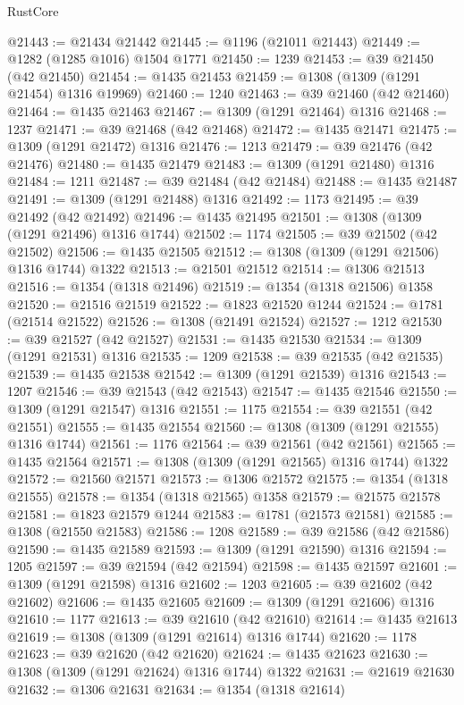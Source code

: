 \begin{lexlean}{RustCore}
\begin{coremodule}
@21443 := @21434 @21442
@21445 := @1196 (@21011 @21443)
@21449 := @1282 (@1285 @1016) @1504 @1771
@21450 := 1239
@21453 := @39 @21450 (@42 @21450)
@21454 := @1435 @21453
@21459 := @1308 (@1309 (@1291 @21454) @1316 @19969)
@21460 := 1240
@21463 := @39 @21460 (@42 @21460)
@21464 := @1435 @21463
@21467 := @1309 (@1291 @21464) @1316
@21468 := 1237
@21471 := @39 @21468 (@42 @21468)
@21472 := @1435 @21471
@21475 := @1309 (@1291 @21472) @1316
@21476 := 1213
@21479 := @39 @21476 (@42 @21476)
@21480 := @1435 @21479
@21483 := @1309 (@1291 @21480) @1316
@21484 := 1211
@21487 := @39 @21484 (@42 @21484)
@21488 := @1435 @21487
@21491 := @1309 (@1291 @21488) @1316
@21492 := 1173
@21495 := @39 @21492 (@42 @21492)
@21496 := @1435 @21495
@21501 := @1308 (@1309 (@1291 @21496) @1316 @1744)
@21502 := 1174
@21505 := @39 @21502 (@42 @21502)
@21506 := @1435 @21505
@21512 := @1308 (@1309 (@1291 @21506) @1316 @1744) @1322
@21513 := @21501 @21512
@21514 := @1306 @21513
@21516 := @1354 (@1318 @21496)
@21519 := @1354 (@1318 @21506) @1358
@21520 := @21516 @21519
@21522 := @1823 @21520 @1244
@21524 := @1781 (@21514 @21522)
@21526 := @1308 (@21491 @21524)
@21527 := 1212
@21530 := @39 @21527 (@42 @21527)
@21531 := @1435 @21530
@21534 := @1309 (@1291 @21531) @1316
@21535 := 1209
@21538 := @39 @21535 (@42 @21535)
@21539 := @1435 @21538
@21542 := @1309 (@1291 @21539) @1316
@21543 := 1207
@21546 := @39 @21543 (@42 @21543)
@21547 := @1435 @21546
@21550 := @1309 (@1291 @21547) @1316
@21551 := 1175
@21554 := @39 @21551 (@42 @21551)
@21555 := @1435 @21554
@21560 := @1308 (@1309 (@1291 @21555) @1316 @1744)
@21561 := 1176
@21564 := @39 @21561 (@42 @21561)
@21565 := @1435 @21564
@21571 := @1308 (@1309 (@1291 @21565) @1316 @1744) @1322
@21572 := @21560 @21571
@21573 := @1306 @21572
@21575 := @1354 (@1318 @21555)
@21578 := @1354 (@1318 @21565) @1358
@21579 := @21575 @21578
@21581 := @1823 @21579 @1244
@21583 := @1781 (@21573 @21581)
@21585 := @1308 (@21550 @21583)
@21586 := 1208
@21589 := @39 @21586 (@42 @21586)
@21590 := @1435 @21589
@21593 := @1309 (@1291 @21590) @1316
@21594 := 1205
@21597 := @39 @21594 (@42 @21594)
@21598 := @1435 @21597
@21601 := @1309 (@1291 @21598) @1316
@21602 := 1203
@21605 := @39 @21602 (@42 @21602)
@21606 := @1435 @21605
@21609 := @1309 (@1291 @21606) @1316
@21610 := 1177
@21613 := @39 @21610 (@42 @21610)
@21614 := @1435 @21613
@21619 := @1308 (@1309 (@1291 @21614) @1316 @1744)
@21620 := 1178
@21623 := @39 @21620 (@42 @21620)
@21624 := @1435 @21623
@21630 := @1308 (@1309 (@1291 @21624) @1316 @1744) @1322
@21631 := @21619 @21630
@21632 := @1306 @21631
@21634 := @1354 (@1318 @21614)

\end{coremodule}
\end{lexlean}
